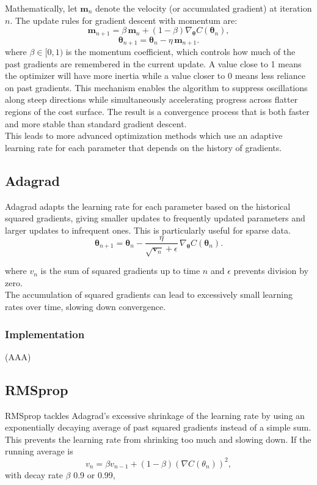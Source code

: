 \documentclass[
 reprint,            %
 amsmath,amssymb,
 aps,
]{revtex4-2}
\begin{document}
Mathematically, let $\boldsymbol{m}_n$ denote the velocity (or accumulated gradient) at iteration $n$. The update rules for gradient descent with momentum are:
\[
\boldsymbol{m}_{n+1} = \beta \, \boldsymbol{m}_n + (1-\beta)\nabla_{\boldsymbol{\theta}} C(\boldsymbol{\theta}_n),
\]
\[
\boldsymbol{\theta}_{n+1} = \boldsymbol{\theta}_n - \eta \, \boldsymbol{m}_{n+1}.
\]
where $\beta \in [0,1)$ is the momentum coefficient, which controls how much of the past gradients are remembered in the current update. A value close to 1 means the optimizer will have more inertia while a value closer to 0 means less reliance on past gradients. This mechanism enables the algorithm to suppress oscillations along steep directions while simultaneously accelerating progress across flatter regions of the cost surface. The result is a convergence process that is both faster and more stable than standard gradient descent.\\
This leads to more advanced optimization methods which use an adaptive learning rate for each parameter that depends on the history of gradients.\\


\subsection{Adagrad}
Adagrad adapts the learning rate for each parameter based on the historical squared gradients, giving smaller updates to frequently updated parameters and larger updates to infrequent ones\cite{hjorthjensen_week37}.
This is particularly useful for sparse data.  
\[
\boldsymbol{\theta}_{n+1} = \boldsymbol{\theta}_n - \frac{\eta}{\sqrt{\boldsymbol{v}_n} + \epsilon} \, \nabla_{\boldsymbol{\theta}} C(\boldsymbol{\theta}_n).
\]

where \(v_n\) is the sum of squared gradients up to time \(n\) and \(\epsilon\) prevents division by zero.  \\

The accumulation of squared gradients can lead to excessively small learning rates over time, slowing down convergence.

\subsubsection{Implementation}
(AAA)

\subsection{RMSprop}
RMSprop tackles Adagrad's excessive shrinkage of the learning rate by using an exponentially decaying average of past squared gradients instead of a simple sum\cite{hjorthjensen_week37}.
This prevents the learning rate from shrinking too much and slowing down.  
If the running average is
\[
v_n = \beta v_{n-1} + (1 - \beta)\left( \nabla C(\theta_n) \right)^2,
\]
with decay rate \(\beta\) 0.9 or 0.99,
\end{document}

